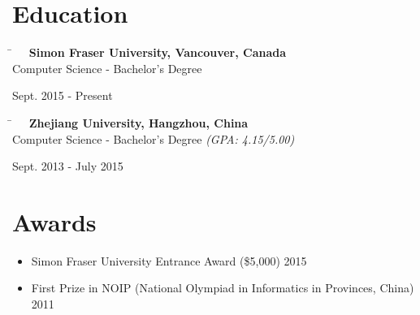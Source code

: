 \documentclass[10pt]{article} %
\begin{document}

\section{Education}

\vspace{-3mm}
\parbox{0.5\textwidth}{
\begin{tabbing}
\hspace{4mm} \= \kill
\>\textbf{\ \ Simon Fraser University, Vancouver, Canada}\\[2mm]
\hspace{13mm} Computer Science - Bachelor's Degree
\end{tabbing}
}
\hfill
\parbox{0.5\textwidth}{
\begin{tabbing}
Sept. 2015 - Present\\[2mm]
\end{tabbing}
}

\vspace{-3mm}
\parbox{0.5\textwidth}{
\begin{tabbing}
\hspace{4mm} \= \kill
\>\textbf{\ \ Zhejiang University, Hangzhou, China}\\[2mm]
\hspace{13mm} Computer Science - Bachelor's Degree \textit{(GPA: 4.15/5.00)}
\end{tabbing}
}
\hfill
\parbox{0.5\textwidth}{
\begin{tabbing}
Sept. 2013 - July 2015\\[2mm]
\end{tabbing}
}


\section{Awards}

\begin{itemize}[leftmargin=10mm]
    \item Simon Fraser University Entrance Award (\$5,000) \hfill 2015
    \item First Prize in NOIP (National Olympiad in Informatics in Provinces, China) \hfill 2011
\end{itemize}
\end{document}

